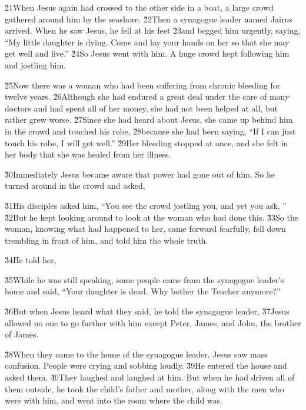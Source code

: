 \v{21}When Jesus again had crossed to the other side in a boat, a large crowd gathered around him by the seashore. \v{22}Then a synagogue leader named Jairus arrived. When he saw Jesus, he fell at his feet \v{23}and begged him urgently, saying, ``My little daughter is dying. Come and lay your hands on her so that she may get well and live.'' \v{24}So Jesus went with him. A huge crowd kept following him and jostling him.

\v{25}Now there was a woman who had been suffering from chronic bleeding for twelve years. \v{26}Although she had endured a great deal under the care of many doctors and had spent all of her money, she had not been helped at all, but rather grew worse. \v{27}Since she had heard about Jesus, she came up behind him in the crowd and touched his robe, \v{28}because she had been saying, ``If I can just touch his robe, I will get well.'' \v{29}Her bleeding stopped at once, and she felt in her body that she was healed from her illness.

\v{30}Immediately Jesus became aware that power had gone out of him. So he turned around in the crowd and asked, 

\v{31}His disciples asked him, ``You see the crowd jostling you, and yet you ask, '' \v{32}But he kept looking around to look at the woman who had done this. \v{33}So the woman, knowing what had happened to her, came forward fearfully, fell down trembling in front of him, and told him the whole truth.

\v{34}He told her, 

\v{35}While he was still speaking, some people came from the synagogue leader's home and said, ``Your daughter is dead. Why bother the Teacher anymore?''

\v{36}But when Jesus heard what they said, he told the synagogue leader,  \v{37}Jesus allowed no one to go further with him except Peter, James, and John, the brother of James.

\v{38}When they came to the home of the synagogue leader, Jesus saw mass confusion. People were crying and sobbing loudly. \v{39}He entered the house and asked them,  \v{40}They laughed and laughed at him. But when he had driven all of them outside, he took the child's father and mother, along with the men who were with him, and went into the room where the child was.


